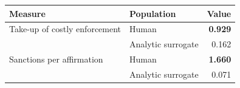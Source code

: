\begin{tabular}{llr}
\toprule
Measure & Population & Value \\
\midrule
Take-up of costly enforcement & Human \citep{guerek2006} & \textbf{0.929} \\
 & Analytic surrogate & 0.162 \\
\midrule
Sanctions per affirmation & Human \citep{guerek2006} & \textbf{1.660} \\
 & Analytic surrogate & 0.071 \\
\bottomrule
\end{tabular}
